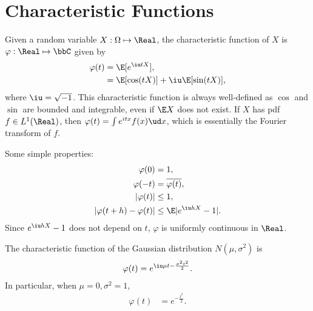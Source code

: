 \documentclass[../aipt.tex]{subfiles}
\begin{document}

\section{Characteristic Functions}

Given a random variable $X: \Omega \mapsto \Real$, the characteristic function of $X$ is $\varphi : \Real\mapsto\bbC$ given by
\begin{align*}
\varphi(t)&=\E [e^{\iu tX}],\\
&=\E[\cos (tX)]+\iu\E [\sin (tX)],
\end{align*}
where $\iu=\sqrt{-1}$. This characteristic function is always well-defined as $\cos$ and $\sin$ are bounded and integrable, even if $\E X$ does not exist. If $X$ has pdf $f\in L^1(\Real)$, then $\varphi(t)=\int e^{itx} f(x) \ud x$, which is essentially the Fourier transform of $f$. 

Some simple properties:
\begin{align*}
\varphi(0)	& =1,\\
\varphi(-t)	& =\overline{\varphi(t)},\\
|\varphi(t)|	& \leq 1,\\
|\varphi(t+h)-\varphi(t)| 	& \leq \E|e^{\iu hX}-1|.
\end{align*}
Since $e^{\iu hX}-1$ does not depend on $t$, $\varphi$ is uniformly continuous in $\Real$. 

\begin{Example}
The characteristic function of the Gaussian distribution $N(\mu,\sigma^2)$ is
\begin{align*}
\varphi(t)=e^{\iu \mu t-\frac{\sigma^2t^2}{2}}.
\end{align*}
In particular, when $\mu=0,\sigma^2=1$,
\begin{align*}
\varphi(t)&=e^{-\frac{t^2}{2}}.
\end{align*}
\end{Example}
\end{document}
